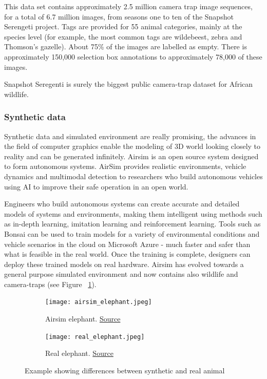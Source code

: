 This data set contains approximately 2.5 million camera trap image sequences, for a total of 6.7 million images, from seasons one to ten of the Snapshot Serengeti project. Tags are provided for 55 animal categories, mainly at the species level (for example, the most common tags are wildebeest, zebra and Thomson's gazelle). About 75\% of the images are labelled as empty. There is approximately 150,000 selection box annotations to approximately 78,000 of these images.

Snapshot Seregenti is surely the biggest public camera-trap dataset for African wildlife.

\pagebreak\subsubsection{Synthetic data}
Synthetic data and simulated environment are really promising, the advances in the field of computer graphics enable the modeling of 3D world looking closely to reality and can be generated infinitely.
Airsim\cite{airsim} is an open source system designed to form autonomous systems. AirSim provides realistic environments, vehicle dynamics and multimodal detection to researchers who build autonomous vehicles using AI to improve their safe operation in an open world.

Engineers who build autonomous systems can create accurate and detailed models of systems and environments, making them intelligent using methods such as in-depth learning, imitation learning and reinforcement learning. Tools such as Bonsai can be used to train models for a variety of environmental conditions and vehicle scenarios in the cloud on Microsoft Azure - much faster and safer than what is feasible in the real world. Once the training is complete, designers can deploy these trained models on real hardware.
Airsim has evolved towards a general purpose simulated environment and now contains also wildlife and camera-traps (see Figure ~\ref{fig:airsim}).

\begin{figure}[H]
\centering
\begin{subfigure}{.5\textwidth}
  \centering
  \texttt{[image: airsim\_elephant.jpeg]}
  \caption{Airsim elephant. \href{http://teamcore.usc.edu/papers/2018/bondi_camera_ready_airsim-w.pdf}{Source}}
\end{subfigure}%
\begin{subfigure}{.5\textwidth}
  \centering
  \texttt{[image: real\_elephant.jpeg]}
  \caption{Real elephant. \href{https://commons.wikimedia.org/wiki/User:Charlesjsharp/favourites}{Source}}
\end{subfigure}
\caption{Example showing differences between synthetic and real animal}
\label{fig:airsim}
\end{figure}

